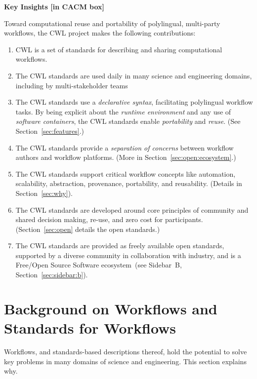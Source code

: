 \documentclass[sigconf,revew,screen,timestamp,nonacm]{acmart}
\newcommand{\modification}[1]{{\color{blue} #1}}
\begin{document}
\textbf{Key Insights [in CACM box]}

Toward computational reuse and portability of polylingual, multi-party workflows, \modification{the CWL project} makes the following contributions:

\begin{enumerate}
\item
  {CWL is a set of standards for describing and sharing computational workflows.}
\item
  {\modification{The CWL standards are} used daily in many science and engineering domains, including by multi-stakeholder teams}
\item
  {\modification{The CWL standards use} a \textit{declarative syntax}, facilitating polylingual workflow tasks. By being explicit about the \textit{runtime environment} and any use of \textit{software containers}, \modification{the CWL standards} enable \textit{portability} and \textit{reuse}. (See Section~\ref{sec:features}.)}
\item
  {The CWL standards provide a \textit{separation of concerns} between workflow authors and workflow platforms. (More in Section~\ref{sec:open:ecosystem}.)}
\item
  {The CWL standards support critical workflow concepts like automation, scalability, abstraction, provenance, portability, and reusability. (Details in Section~\ref{sec:why}).}
\item
  {\modification{The CWL standards are} developed around core principles of community and shared decision making, re-use, and zero cost for participants. (Section~\ref{sec:open} details the open standards.)}
\item
  {\modification{The CWL standards are} provided as freely available open standards, supported by a diverse community in collaboration with industry, and is a Free/Open Source Software ecosystem~(see Sidebar~B, Section~\ref{sec:sidebar:b}).}
\end{enumerate}

\section{Background on Workflows and Standards for Workflows}\label{sec:bg}\label{sec:why}

Workflows, and standards-based descriptions thereof, hold the potential to solve key problems in many domains of science and engineering. This section explains why.
\end{document}
